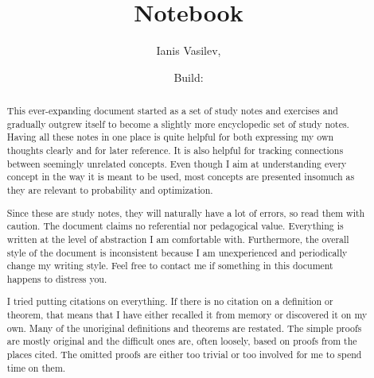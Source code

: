 \documentclass[bibliography=totocnumbered]{scrartcl}
\title{Notebook}
\subtitle{\URL{https://github.com/v--/notebook}}
\author{Ianis Vasilev, \Email{ianis@ivasilev.net}}
\date{Build: }
\begin{document}
\hfuzz=3.5pt
\maketitle

\begin{abstract}
  This ever-expanding document started as a set of study notes and exercises and gradually outgrew itself to become a slightly more encyclopedic set of study notes. Having all these notes in one place is quite helpful for both expressing my own thoughts clearly and for later reference. It is also helpful for tracking connections between seemingly unrelated concepts. Even though I aim at understanding every concept in the way it is meant to be used, most concepts are presented insomuch as they are relevant to probability and optimization.

  Since these are study notes, they will naturally have a lot of errors, so read them with caution. The document claims no referential nor pedagogical value. Everything is written at the level of abstraction I am comfortable with. Furthermore, the overall style of the document is inconsistent because I am unexperienced and periodically change my writing style. Feel free to contact me if something in this document happens to distress you.

  I tried putting citations on everything. If there is no citation on a definition or theorem, that means that I have either recalled it from memory or discovered it on my own. Many of the unoriginal definitions and theorems are restated. The simple proofs are mostly original and the difficult ones are, often loosely, based on proofs from the places cited. The omitted proofs are either too trivial or too involved for me to spend time on them.
\end{abstract}

\newpage
\tableofcontents
\newpage



























\end{document}
